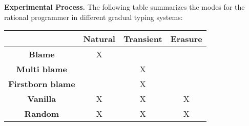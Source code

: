 \noindent
{\bf Experimental Process.} The following table summarizes the modes for the rational programmer in
different gradual typing systems:

\center
\begin{tabular}[c]{c|c|c|c}
                       & {\bf Natural}  & {\bf Transient} & {\bf Erasure}  \\
\hline 
{\bf Blame}            &       X        &                 &                \\
  {\bf Multi blame}    &                &        X        &                \\
 {\bf Firstborn blame} &                &        X        &                \\
{\bf Vanilla}          &       X        &        X        &       X        \\
{\bf Random}           &       X        &        X        &       X        \\
\end{tabular}  
  
